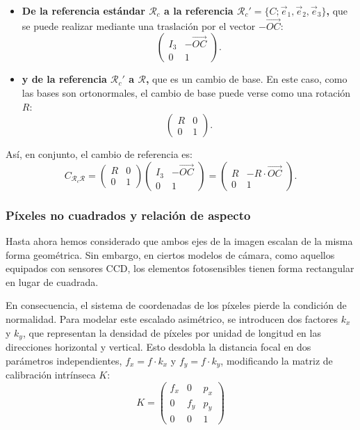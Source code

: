 \documentclass[
10pt, %
a4paper, %
oneside, %
headinclude,footinclude, %
BCOR=5mm, %
]{scrartcl}
\begin{document}
\begin{itemize}
    \item \textbf{De la referencia estándar $\mathcal{R}_c$ a la referencia $\mathcal{R}_c' = \{C; \vec{e}_1, \vec{e}_2, \vec{e}_3\}$,} que se puede realizar mediante una traslación por el vector $-\vec{OC}$:
    \[
        \left( \begin{array}{c|c} I_3 & -\vec{OC} \\ \hline 0 & 1 \end{array} \right).
    \]
    \item \textbf{y de la referencia $\mathcal{R}_c'$ a $\mathcal{R}$,} que es un cambio de base. En este caso, como las bases son ortonormales, el cambio de base puede verse como una rotación $R$:
    \[
        \left( \begin{array}{c|c} R & 0 \\ \hline 0 & 1 \end{array} \right).
    \]
\end{itemize}

Así, en conjunto, el cambio de referencia es:
\[
    C_{\mathcal{R}_c\mathcal{R}} = \left( \begin{array}{c|c} R & 0 \\ \hline 0 & 1 \end{array} \right) \left( \begin{array}{c|c} I_3 & -\vec{OC} \\ \hline 0 & 1 \end{array} \right) = \left( \begin{array}{c|c} R & -R \cdot \vec{OC} \\ \hline 0 & 1 \end{array} \right).
\]

\subsubsection{Píxeles no cuadrados y relación de aspecto}

Hasta ahora hemos considerado que ambos ejes de la imagen escalan de la misma forma geométrica. Sin embargo, en ciertos modelos de cámara, como aquellos equipados con sensores CCD, los elementos fotosensibles tienen forma rectangular en lugar de cuadrada. 

En consecuencia, el sistema de coordenadas de los píxeles pierde la condición de normalidad. Para modelar este escalado asimétrico, se introducen dos factores $k_x$ y $k_y$, que representan la densidad de píxeles por unidad de longitud en las direcciones horizontal y vertical. Esto desdobla la distancia focal en dos parámetros independientes, $f_x = f \cdot k_x$ y $f_y = f \cdot k_y$, modificando la matriz de calibración intrínseca $K$:
\[
    K = \begin{pmatrix}
        f_x & 0 & p_x \\
        0 & f_y & p_y \\
        0 & 0 & 1
    \end{pmatrix}
\]
\end{document}
